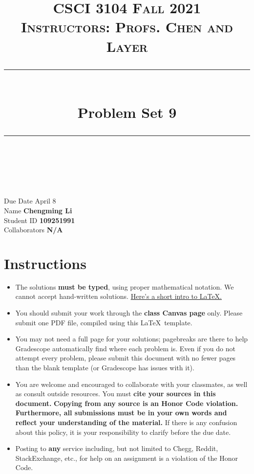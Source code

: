 \documentclass[11pt]{article}
\title{
\normalfont \normalsize 
\textsc{CSCI 3104 Fall 2021 \\ 
Instructors: Profs. Chen and Layer} \\
[10pt] 
\rule{\linewidth}{0.5pt} \\[6pt] 
\huge Problem Set 9 \\
\rule{\linewidth}{2pt}  \\[10pt]
}
\date{}
\theoremstyle{definition}
\theoremstyle{definition}
\theoremstyle{definition}
\begin{document}
\maketitle


\noindent
Due Date \dotfill April 8 \\
Name \dotfill \textbf{Chengming Li} \\
Student ID \dotfill \textbf{109251991} \\
Collaborators \dotfill \textbf{N/A}

\tableofcontents

\section{Instructions}
 \begin{itemize}
	\item The solutions \textbf{must be typed}, using proper mathematical notation. We cannot accept hand-written solutions. \href{http://ece.uprm.edu/~caceros/latex/introduction.pdf}{Here's a short intro to \LaTeX.}
	\item You should submit your work through the \textbf{class Canvas page} only. Please submit one PDF file, compiled using this \LaTeX \ template.
	\item You may not need a full page for your solutions; pagebreaks are there to help Gradescope automatically find where each problem is. Even if you do not attempt every problem, please submit this document with no fewer pages than the blank template (or Gradescope has issues with it).

	\item You are welcome and encouraged to collaborate with your classmates, as well as consult outside resources. You must \textbf{cite your sources in this document.} \textbf{Copying from any source is an Honor Code violation. Furthermore, all submissions must be in your own words and reflect your understanding of the material.} If there is any confusion about this policy, it is your responsibility to clarify before the due date. 

	\item Posting to \textbf{any} service including, but not limited to Chegg, Reddit, StackExchange, etc., for help on an assignment is a violation of the Honor Code.
\end{itemize}
\end{document}
